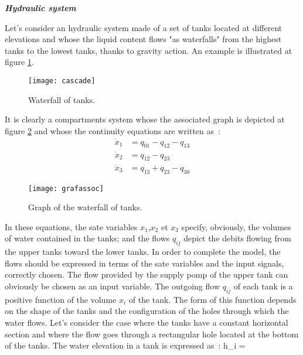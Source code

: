 \begin{exemple}\label{systhyd}{\bf \em Hydraulic system}

Let's consider an hydraulic system made of a set of 
tanks located at different elevations and whose the liquid content  
flows "as waterfalls" from the highest tanks to the lowest tanks, 
thanks to gravity action. An example is illustrated at figure \ref{Fig:cascade}.

\begin{figure}[h] 
\begin{center}
\texttt{[image: cascade]}
\caption{Waterfall of tanks.}
\label{Fig:cascade}
\end{center} 
\end{figure}

It is clearly a compartments system whose the associated graph 
is depicted at figure \ref{Fig:grafassoc} and whose the continuity 
equations are written as~:
\begin{equation*} \begin{split} 
\dot x_1 &= q_{01} - q_{12} - q_{13} \\
\dot x_2 &=  q_{12} - q_{23} \\
\dot x_3 &= q_{13} + q_{23} - q_{30} 
\end{split} \end{equation*}
\begin{figure}[h] 
\begin{center}
\texttt{[image: grafassoc]}
\caption{Graph of the waterfall of tanks.}
\label{Fig:grafassoc}
\end{center} 
\end{figure}
In these equations, the sate variables $x_1$,$ x_2$ et $x_3$ specify, 
obviously, the volumes of water contained in the tanks; and the flows 
$q_{ij}$ depict the debits flowing from the upper tanks toward the lower 
tanks. In order to complete the model, the flows should be expressed in
terms of the sate variables and the input signals, correctly chosen.
The flow provided by the supply pomp of the upper tank can obviously be 
chosen as an input variable. The outgoing flow $q_{ij}$ of each tank 
is a positive function of the volume $x_i$ of the tank. The form of 
this function depends on the shape of the tanks and the configuration of 
the holes through which the water flows. Let's consider the case where the tanks 
have a constant horizontal section and where the flow goes through a 
rectangular hole located at the bottom of the tanks. The water elevation in 
a tank is expressed as~:
\eqnn
h_i = 

\end{exemple}
